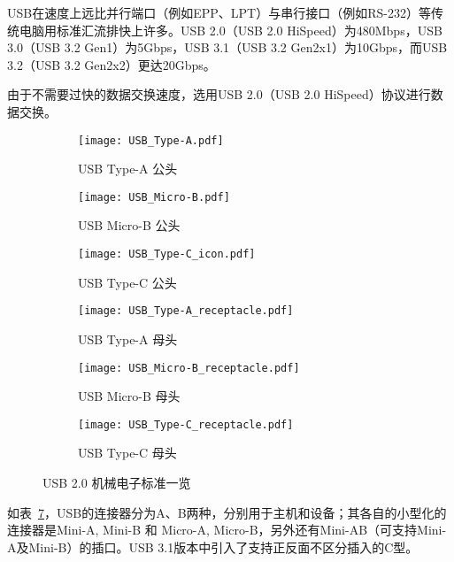 USB在速度上远比并行端口（例如EPP、LPT）与串行接口（例如RS-232）等传统电脑用标准汇流排快上许多。USB 2.0（USB 2.0 HiSpeed）为480Mbps，USB 3.0（USB 3.2 Gen1）为5Gbps，USB 3.1（USB 3.2 Gen2x1）为10Gbps，而USB 3.2（USB 3.2 Gen2x2）更达20Gbps。

由于不需要过快的数据交换速度，选用USB 2.0（USB 2.0 HiSpeed）协议进行数据交换。

\begin{figure}[htbp]
    \centering %
    \begin{subfigure}{0.25\textwidth}
    \texttt{[image: USB\_Type-A.pdf]}
    \caption{USB Type-A 公头}
    \label{fig:USB-1}
    \end{subfigure}\hfil %
    \begin{subfigure}{0.25\textwidth}
    \texttt{[image: USB\_Micro-B.pdf]}
    \caption{USB Micro-B 公头}
    \label{fig:USB-2}
    \end{subfigure}\hfil %
    \begin{subfigure}{0.25\textwidth}
    \texttt{[image: USB\_Type-C\_icon.pdf]}
    \caption{USB Type-C 公头}
    \label{fig:USB-3}
    \end{subfigure}

    \medskip
    \begin{subfigure}{0.25\textwidth}
    \texttt{[image: USB\_Type-A\_receptacle.pdf]}
    \caption{USB Type-A 母头}
    \label{fig:USB-4}
    \end{subfigure}\hfil %
    \begin{subfigure}{0.25\textwidth}
    \texttt{[image: USB\_Micro-B\_receptacle.pdf]}
    \caption{USB Micro-B 母头}
    \label{fig:USB-5}
    \end{subfigure}\hfil %
    \begin{subfigure}{0.25\textwidth}
    \texttt{[image: USB\_Type-C\_receptacle.pdf]}
    \caption{USB Type-C 母头}
    \label{fig:USB-6}
    \end{subfigure}
    \caption{USB 2.0 机械电子标准一览}
    \label{fig:USB-M}
\end{figure}


如表~\ref{fig:USB-M}，USB的连接器分为A、B两种，分别用于主机和设备；其各自的小型化的连接器是Mini-A, Mini-B 和 Micro-A, Micro-B，另外还有Mini-AB（可支持Mini-A及Mini-B）的插口。USB 3.1版本中引入了支持正反面不区分插入的C型。

